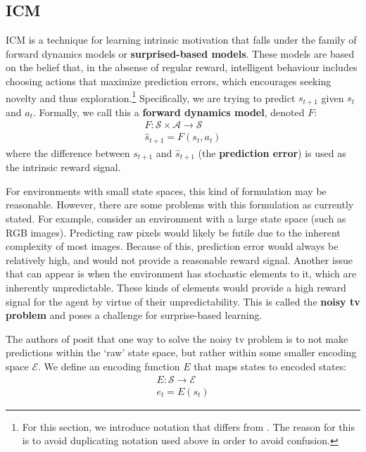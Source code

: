 \documentclass[journal, onecolumn, 12pt, draftclsnofoot]{IEEEtran}
\newcommand{\kword}[1]{\textbf{#1}}
\newcommand{\mc}[1]{\mathcal{#1}}
\begin{document}
	\subsection{ICM}
	\par ICM is a technique for learning intrinsic motivation that falls under the family of forward dynamics models or \kword{surprised-based models}. These models are based on the belief that, in the absense of regular reward, intelligent behaviour includes choosing actions that maximize prediction errors, which encourages seeking novelty and thus exploration.\footnote{For this section, we introduce notation that differs from \cite{icm}. The reason for this is to avoid duplicating notation used above in order to avoid confusion.} Specifically, we are trying to predict $s_{t+1}$ given $s_t$ and $a_t$. Formally, we call this a \kword{forward dynamics model}, denoted $F$:
	\begin{align}
		F:\mc{S} \times \mc{A} \to \mc{S} \\
		\hat{s}_{t+1} = F(s_t, a_t)
	\end{align}
	where the difference between $s_{t+1}$ and $\hat{s}_{t+1}$ (the \kword{prediction error}) is used as the intrinsic reward signal.
	\par For environments with small state spaces, this kind of formulation may be reasonable. However, there are some problems with this formulation as currently stated. For example, consider an environment with a large state space (such as RGB images). Predicting raw pixels would likely be futile due to the inherent complexity of most images. Because of this, prediction error would always be relatively high, and would not provide a reasonable reward signal. Another issue that can appear is when the environment has stochastic elements to it, which are inherently unpredictable. These kinds of elements would provide a high reward signal for the agent by virtue of their unpredictability. This is called the \kword{noisy tv problem} and poses a challenge for surprise-based learning.
	\par The authors of \cite{icm} posit that one way to solve the noisy tv problem is to not make predictions within the `raw' state space, but rather within some smaller encoding space $\mc{E}$. We define an encoding function $E$ that maps states to encoded states:
	\begin{align}
		\label{eqn:encoding}
		E: \mc{S} \to \mc{E} \\
		e_t = E(s_t)
	\end{align}
\end{document}
